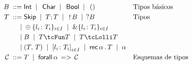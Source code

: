 \begin{figure}[h!]
  \begin{align*}
    \tcBase \grmeq & \inte \grmor \, \chare \grmor \, \boole \grmor \, \unite && \text{Tipos básicos}\\
    T \grmeq       & \tskip \grmor \tSemi{T}{T} \grmor \,\tOut{\tcBase} \grmor \,\tIn{\tcBase} && \text{Tipos}\\
    \grmor         & \tIChoice\{l_i\colon T_i\}_{i\in I} \grmor \tEChoice\{l_i\colon T_i\}_{i\in I} \\ 
    \grmor         & \tcBase \grmor \tUnFun{T}{T} \grmor \tLinFun{T}{T}\\   
    \grmor         & \tPair{T}{T} \grmor \tDatatype{l_i\colon T_i}_{i\in I} \grmor \tRec{\alpha}{T} \grmor \alpha\\
    \kindsch \grmeq & T \grmor \tForall{\alpha}{\kindsch}  && \text{Esquemas de tipos}
  \end{align*}
\end{figure}


